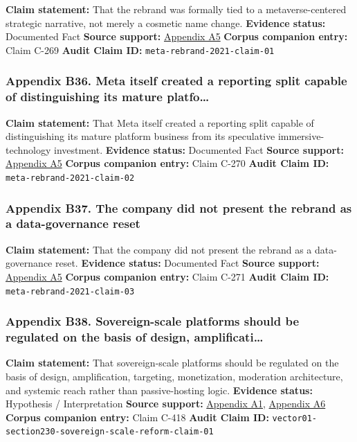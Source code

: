 \documentclass[
  american,
  11pt,
  letterpaper,
]{article}
\begin{document}
\textbf{Claim statement:} That the rebrand was formally tied to a
metaverse-centered strategic narrative, not merely a cosmetic name
change. \textbf{Evidence status:} Documented Fact \textbf{Source
support:}
\hyperref[appendix-a5-the-facebook-company-is-now-meta]{Appendix A5}
\textbf{Corpus companion entry:} Claim C-269 \textbf{Audit Claim ID:}
\texttt{meta-rebrand-2021-claim-01}

\subsubsection{Appendix B36. Meta itself created a reporting split
capable of distinguishing its mature
platfo\ldots{}}\label{appendix-b36-meta-itself-created-a-reporting-split-capable-of-distinguishing-its-mature-platfo}

\textbf{Claim statement:} That Meta itself created a reporting split
capable of distinguishing its mature platform business from its
speculative immersive-technology investment. \textbf{Evidence status:}
Documented Fact \textbf{Source support:}
\hyperref[appendix-a5-the-facebook-company-is-now-meta]{Appendix A5}
\textbf{Corpus companion entry:} Claim C-270 \textbf{Audit Claim ID:}
\texttt{meta-rebrand-2021-claim-02}

\subsubsection{Appendix B37. The company did not present the rebrand as
a data-governance
reset}\label{appendix-b37-the-company-did-not-present-the-rebrand-as-a-data-governance-reset}

\textbf{Claim statement:} That the company did not present the rebrand
as a data-governance reset. \textbf{Evidence status:} Documented Fact
\textbf{Source support:}
\hyperref[appendix-a5-the-facebook-company-is-now-meta]{Appendix A5}
\textbf{Corpus companion entry:} Claim C-271 \textbf{Audit Claim ID:}
\texttt{meta-rebrand-2021-claim-03}

\subsubsection{Appendix B38. Sovereign-scale platforms should be
regulated on the basis of design,
amplificati\ldots{}}\label{appendix-b38-sovereign-scale-platforms-should-be-regulated-on-the-basis-of-design-amplificati}

\textbf{Claim statement:} That sovereign-scale platforms should be
regulated on the basis of design, amplification, targeting,
monetization, moderation architecture, and systemic reach rather than
passive-hosting logic. \textbf{Evidence status:} Hypothesis /
Interpretation \textbf{Source support:}
\hyperref[appendix-a1-a-look-behind-the-screens-examining-the-data-practices-of-social-media-and-video-streaming-services]{Appendix
A1},
\hyperref[appendix-a6-meta-platforms-inc-2023-annual-report-form-10-k]{Appendix
A6} \textbf{Corpus companion entry:} Claim C-418 \textbf{Audit Claim
ID:} \texttt{vector01-section230-sovereign-scale-reform-claim-01}
\end{document}
